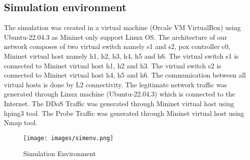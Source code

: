 \subsection{Simulation environment}
\vspace{-18pt}
The simulation was created in a virtual machine (Orcale VM VirtualBox) using Ubuntu-22.04.3 as Mininet only support Linux OS. The architecture of our network composes of two virtual switch namely s1 and s2, pox controller c0, Mininet virtual host namely h1, h2, h3, h4, h5 and h6. The virtual switch s1 is connected to Mininet virtual host h1, h2 and h3. The virtual switch s2 is connected to Mininet virtual host h4, h5 and h6. The communication between all virtual hosts is done by L2 connectivity. The legitimate network traffic was generated through Linux machine (Ubuntu-22.04.3) which is connected to the Internet. The DDoS Traffic was generated through Mininet virtual host using hping3 tool. The Probe Traffic was generated through Mininet virtual host using Nmap tool.\par 

\begin{figure}[tbh]
	\begin{center}
		\texttt{[image: images/simenv.png]} 
		\caption{Simulation Environment} %
		\label{Simulation Environment} %
	\end{center}
\end{figure}

